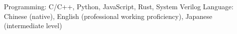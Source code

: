 \documentclass[10pt,a4paper]{article}
\begin{document}

\inlineheadsection  %
  {Programming:}
  {C/C++, Python, JavaScript, Rust, System Verilog}
  \inlineheadsection
  {Language:}
  {Chinese (native), English (professional working proficiency), Japanese (intermediate level)}
\inlineheadsection  %
{}{}
\end{document}
